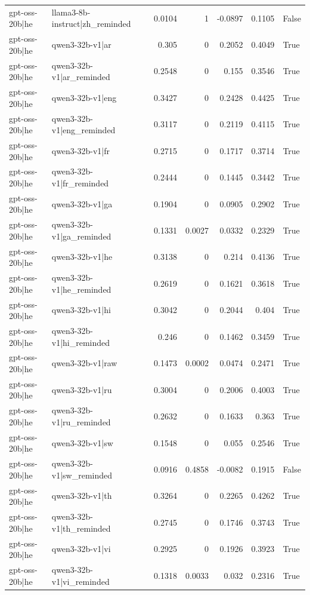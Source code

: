 \begin{table}
\begin{tabular}{l l r r r r l}
gpt-oss-20b|he & llama3-8b-instruct|zh_reminded & 0.0104 & 1 & -0.0897 & 0.1105 & False \\
gpt-oss-20b|he & qwen3-32b-v1|ar & 0.305 & 0 & 0.2052 & 0.4049 & True \\
gpt-oss-20b|he & qwen3-32b-v1|ar_reminded & 0.2548 & 0 & 0.155 & 0.3546 & True \\
gpt-oss-20b|he & qwen3-32b-v1|eng & 0.3427 & 0 & 0.2428 & 0.4425 & True \\
gpt-oss-20b|he & qwen3-32b-v1|eng_reminded & 0.3117 & 0 & 0.2119 & 0.4115 & True \\
gpt-oss-20b|he & qwen3-32b-v1|fr & 0.2715 & 0 & 0.1717 & 0.3714 & True \\
gpt-oss-20b|he & qwen3-32b-v1|fr_reminded & 0.2444 & 0 & 0.1445 & 0.3442 & True \\
gpt-oss-20b|he & qwen3-32b-v1|ga & 0.1904 & 0 & 0.0905 & 0.2902 & True \\
gpt-oss-20b|he & qwen3-32b-v1|ga_reminded & 0.1331 & 0.0027 & 0.0332 & 0.2329 & True \\
gpt-oss-20b|he & qwen3-32b-v1|he & 0.3138 & 0 & 0.214 & 0.4136 & True \\
gpt-oss-20b|he & qwen3-32b-v1|he_reminded & 0.2619 & 0 & 0.1621 & 0.3618 & True \\
gpt-oss-20b|he & qwen3-32b-v1|hi & 0.3042 & 0 & 0.2044 & 0.404 & True \\
gpt-oss-20b|he & qwen3-32b-v1|hi_reminded & 0.246 & 0 & 0.1462 & 0.3459 & True \\
gpt-oss-20b|he & qwen3-32b-v1|raw & 0.1473 & 0.0002 & 0.0474 & 0.2471 & True \\
gpt-oss-20b|he & qwen3-32b-v1|ru & 0.3004 & 0 & 0.2006 & 0.4003 & True \\
gpt-oss-20b|he & qwen3-32b-v1|ru_reminded & 0.2632 & 0 & 0.1633 & 0.363 & True \\
gpt-oss-20b|he & qwen3-32b-v1|sw & 0.1548 & 0 & 0.055 & 0.2546 & True \\
gpt-oss-20b|he & qwen3-32b-v1|sw_reminded & 0.0916 & 0.4858 & -0.0082 & 0.1915 & False \\
gpt-oss-20b|he & qwen3-32b-v1|th & 0.3264 & 0 & 0.2265 & 0.4262 & True \\
gpt-oss-20b|he & qwen3-32b-v1|th_reminded & 0.2745 & 0 & 0.1746 & 0.3743 & True \\
gpt-oss-20b|he & qwen3-32b-v1|vi & 0.2925 & 0 & 0.1926 & 0.3923 & True \\
gpt-oss-20b|he & qwen3-32b-v1|vi_reminded & 0.1318 & 0.0033 & 0.032 & 0.2316 & True \\

\end{tabular}
\end{table}
